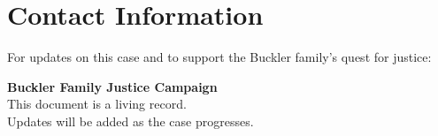 \documentclass[11pt,a4paper]{article}
\begin{document}
\section{Contact Information}

For updates on this case and to support the Buckler family's quest for justice:

\begin{center}
\begin{tcolorbox}[colback=lightgray,colframe=darkblue,width=0.8\textwidth]
\centering
\textbf{Buckler Family Justice Campaign}\\[0.3cm]
This document is a living record.\\
Updates will be added as the case progresses.
\end{tcolorbox}
\end{center}
\end{document}
